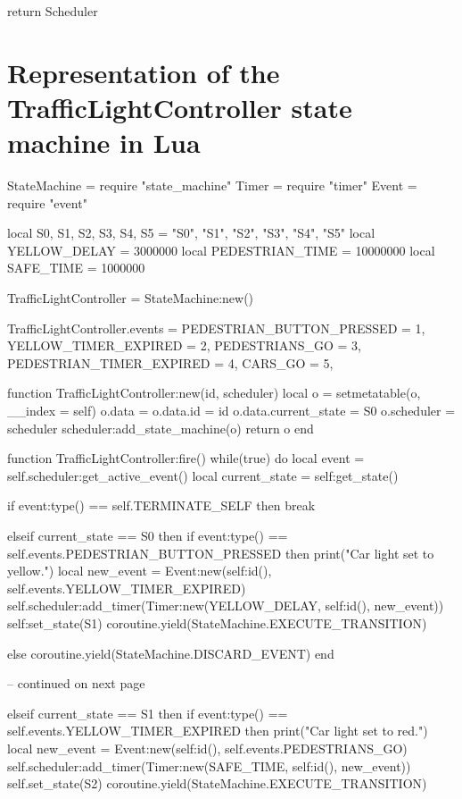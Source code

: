 \begin{appendices}
\begin{listing}[htp]
\begin{luacode}
return Scheduler
\end{luacode}
\end{listing}

\chapter{Representation of the TrafficLightController state machine in Lua}
\label{app:traffic_light}

\begin{luacode}
StateMachine = require "state_machine"
Timer = require "timer"
Event = require "event"

local S0, S1, S2, S3, S4, S5 = "S0", "S1", "S2", "S3", "S4", "S5"
local YELLOW_DELAY = 3000000
local PEDESTRIAN_TIME = 10000000
local SAFE_TIME = 1000000

TrafficLightController = StateMachine:new()

TrafficLightController.events = {
	PEDESTRIAN_BUTTON_PRESSED = 1,
	YELLOW_TIMER_EXPIRED = 2,
	PEDESTRIANS_GO = 3,
	PEDESTRIAN_TIMER_EXPIRED = 4,
	CARS_GO = 5,
}

function TrafficLightController:new(id, scheduler)
	local o = {}
	setmetatable(o, { __index = self})
	o.data = {}
	o.data.id = id
	o.data.current_state = S0
	o.scheduler = scheduler
	scheduler:add_state_machine(o)
	return o
end

function TrafficLightController:fire()
	while(true) do
		local event = self.scheduler:get_active_event()
		local current_state = self:get_state()

		if event:type() == self.TERMINATE_SELF then
			break

		elseif current_state == S0 then
			if event:type() == self.events.PEDESTRIAN_BUTTON_PRESSED then
				print("Car light set to yellow.")
				local new_event = Event:new(self:id(), self.events.YELLOW_TIMER_EXPIRED)
				self.scheduler:add_timer(Timer:new(YELLOW_DELAY, self:id(), new_event))
				self:set_state(S1)
				coroutine.yield(StateMachine.EXECUTE_TRANSITION)

			else
				coroutine.yield(StateMachine.DISCARD_EVENT)
			end

-- continued on next page
\end{luacode}

\begin{listing}[htp]
\begin{luacode}
		elseif current_state == S1 then
			if event:type() == self.events.YELLOW_TIMER_EXPIRED then
				print("Car light set to red.")
				local new_event = Event:new(self:id(), self.events.PEDESTRIANS_GO)
				self.scheduler:add_timer(Timer:new(SAFE_TIME, self:id(), new_event))
				self.set_state(S2)
				coroutine.yield(StateMachine.EXECUTE_TRANSITION)


\end{luacode}
\end{listing}
\end{appendices}
